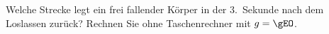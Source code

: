 Welche Strecke legt ein frei fallender Körper in der 3.~Sekunde nach dem Loslassen zurück? Rechnen Sie ohne Taschenrechner mit $g = \gEO$.
